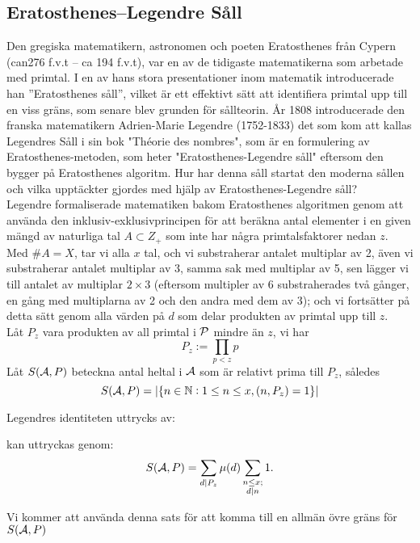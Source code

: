 

\subsection{Eratosthenes–Legendre Såll}
\hspace{0.3cm} Den gregiska matematikern, astronomen och poeten Eratosthenes från Cypern (can276 f.v.t – ca 194 f.v.t), var en av de tidigaste matematikerna som arbetade med primtal. I en av hans stora presentationer inom matematik introducerade han ”Eratosthenes såll”, vilket är ett effektivt sätt att identifiera primtal upp till en viss gräns, som senare blev grunden för sållteorin.
År 1808 introducerade den franska matematikern Adrien-Marie Legendre (1752-1833) det som kom att kallas Legendres Såll i sin bok "Théorie des nombres", som är en formulering av Eratosthenes-metoden, som heter "Eratosthenes-Legendre såll" eftersom den bygger på Eratosthenes algoritm. Hur har denna såll startat den moderna sållen och vilka upptäckter gjordes med hjälp av Eratosthenes-Legendre såll?\\



 Legendre formaliserade matematiken bakom Eratosthenes algoritmen genom att använda den inklusiv-exklusivprincipen för att beräkna antal elementer i en given mängd av naturliga tal  $ A\subset Z_{+} $ som inte har några primtalsfaktorer nedan $ z $. Med $  \#A=X $, tar vi alla $ x $ tal, och vi substraherar antalet multiplar av 2, även vi substraherar antalet multiplar av 3, samma sak med multiplar av 5, sen lägger vi till antalet av multiplar $ 2\times3 $ (eftersom multipler av 6 substraherades två gånger, en gång med multiplarna av 2 och den andra med dem av 3); och vi fortsätter på detta sätt genom alla värden på  $ d $ som delar produkten av primtal upp till  $ z $. \\
 

Låt $ P_z $ vara produkten av all primtal i $ \P $ mindre än $ z $, vi har
\[P_z:=\prod_{p<z}p\]
Låt $ S(\A, P) $ beteckna antal heltal i $ \A $ som är relativt prima till $ P_z $, således
\[S(\A, P)=\vert \lbrace n\in \mathbb{N}:1\leq n\leq x, (n,P_z)=1 \rbrace\vert\]


Legendres identiteten uttrycks av: 

\begin{theorem} kan uttryckas genom:
\[S(\A, P)=\sum_{d\divides P_z}\mu(d)\sum_{\substack{n\leq x;\\d\divides n}}1. \]
\end{theorem}
Vi kommer att använda denna sats för att komma till en allmän övre gräns för $ S(\A, P) $\\

